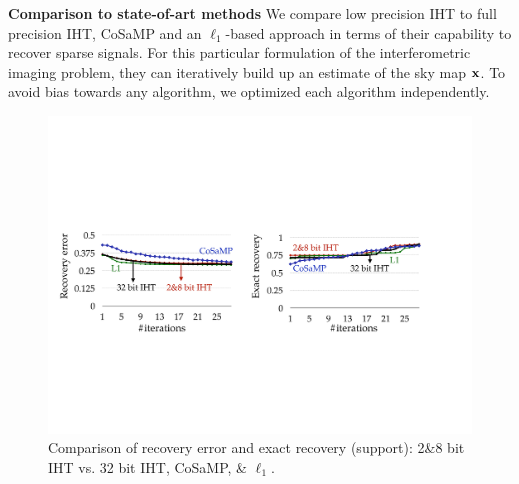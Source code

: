 \documentclass{article}
\begin{document}


{\bf Comparison to state-of-art methods}
We compare low precision IHT to full precision IHT, CoSaMP and an $\ell_1$-based approach in terms of their capability to recover sparse signals. For this particular formulation of the interferometric imaging problem, they can iteratively build up an estimate of the sky map ${\bf x}$. To avoid bias towards any algorithm, we optimized each algorithm independently.

\begin{figure}[t]
\centering
\includegraphics[width=0.9\columnwidth, angle=0]{figs/comparison_k.pdf}
\caption{Comparison of recovery error and exact recovery (support): {2\&8 bit} IHT vs. 32 bit IHT, CoSaMP, \& $\ell_1$.}
\label{fig:comparison}
\vspace{-1em}
\end{figure}
\end{document}

